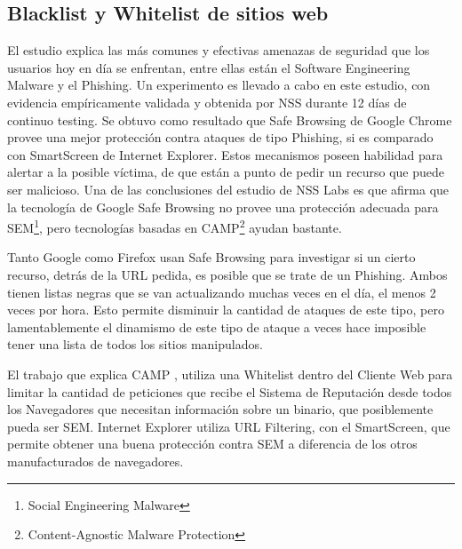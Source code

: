 
 \subsection{Blacklist y Whitelist de sitios web}

    El estudio \cite{browSecPhish} explica las más comunes y efectivas amenazas de seguridad que los usuarios hoy en día se enfrentan, entre ellas están el Software Engineering Malware y el Phishing. Un experimento es llevado a cabo en este estudio, con evidencia empíricamente validada y obtenida por NSS durante 12 días de continuo testing. Se obtuvo como resultado que Safe Browsing de Google Chrome provee una mejor protección contra ataques de tipo Phishing, si es comparado con SmartScreen de Internet Explorer. Estos mecanismos poseen habilidad para alertar a la posible víctima, de  que están a punto de pedir un recurso que puede ser malicioso. Una de las conclusiones del estudio de NSS Labs \cite{rowSecSEMBlock} es que afirma que la tecnología de Google Safe Browsing no provee una protección adecuada para SEM\footnote{Social Engineering Malware}, pero tecnologías basadas en CAMP\footnote{Content-Agnostic Malware Protection} ayudan bastante.

    Tanto Google como Firefox usan Safe Browsing para investigar si un cierto recurso, detrás de la URL pedida, es posible que se trate de un Phishing. Ambos tienen listas negras que se van actualizando muchas veces en el día, el menos 2 veces por hora. Esto permite disminuir la cantidad de ataques de este tipo, pero lamentablemente el dinamismo de este tipo de ataque a veces hace imposible tener una lista de todos los sitios manipulados.

    El trabajo que explica CAMP \cite{Rajab2013}, utiliza una Whitelist dentro del Cliente Web para limitar la cantidad de peticiones que recibe el Sistema de Reputación desde todos los Navegadores que necesitan información sobre un binario, que posiblemente pueda ser SEM.
    Internet Explorer utiliza URL Filtering, con el SmartScreen, que permite obtener una buena protección contra SEM \cite{rowSecSEMBlock} a diferencia de los otros manufacturados de navegadores.

